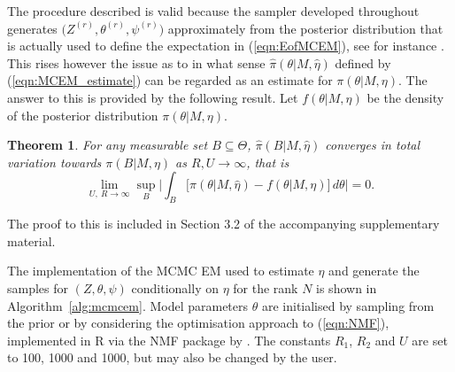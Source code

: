 \documentclass{bioinfo}
\newtheorem{thrm}{Theorem}
\begin{document}
The procedure described is valid because the sampler developed
throughout generates $\big(Z^{(r)}, \theta^{(r)}, \psi^{(r)}\big)$
approximately from the posterior distribution that is actually used to
define the expectation in (\ref{eqn:EofMCEM}), see for instance
\cite{FM}. This rises however the issue as to in what sense
$\widehat\pi(\theta|M, \hat\eta)$ defined by (\ref{eqn:MCEM_estimate})
can be regarded as an estimate for $\pi(\theta|M, \eta)$. The answer
to this is provided by the following result. Let $f(\theta|M, \eta)$
be the density of the posterior distribution $\pi(\theta|M, \eta)$.

\begin{thrm} For any measurable set $B\subseteq \Theta$,
 $\widehat\pi(B|M,\hat\eta)$ converges in total variation
towards $\pi(B|M,\eta)$ as $R, U \to \infty$, that is
\[
   \lim_{U,\ R\to\infty}
   \sup_{B}
    \bigg|
     \int_B
     \Big[
       \widehat \pi(\theta|M, \hat\eta) - f(\theta|M,\eta)
     \Big]\, d\theta
    \bigg|
   = 0.
\]
\end{thrm}

The proof to this is included in Section 3.2 of the accompanying 
supplementary material. 

The implementation of the MCMC EM used to estimate $\eta$ and generate
the samples for $(Z, \theta, \psi)$ conditionally on $\eta$ for the
rank $N$ is shown in Algorithm~\ref{alg:mcmcem}. Model parameters
$\theta$ are initialised by sampling from the prior or by considering
the optimisation approach to (\ref{eqn:NMF}), implemented in R via the
NMF package by \cite{GS}. The constants $R_1$, $R_2$ and $U$ are set
to 100, 1000 and 1000, but may also be changed by the user.
\end{document}
